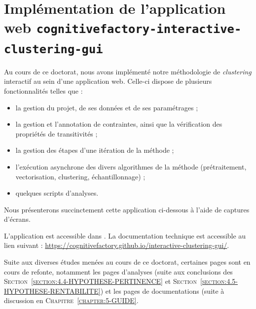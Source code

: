\section{Implémentation de l'application web \texttt{cognitivefactory-interactive-clustering-gui}}
\label{section:C.3-DESCRIPTION-IMPLEMENTATION-INTERACTIVE-CLUSTERING-GUI}

	Au cours de ce doctorat, nous avons implémenté notre méthodologie de \textit{clustering} interactif au sein d'une application web.
	Celle-ci dispose de plusieurs fonctionnalités telles que :
	\begin{itemize}
		\item la gestion du projet, de ses données et de ses paramétrages ;
		\item la gestion et l'annotation de contraintes, ainsi que la vérification des propriétés de transitivités ;
		\item la gestion des étapes d'une itération de la méthode ;
		\item l'exécution asynchrone des divers algorithmes de la méthode (prétraitement, vectorisation, clustering, échantillonnage) ;
		\item quelques scripts d'analyses.
	\end{itemize}
	
	Nous présenterons succinctement cette application ci-dessous à l'aide de captures d'écrans.
	
	\begin{leftBarInformation}
		L'application est accessible dans \cite{schild-etal:2022:cognitivefactory-interactiveclusteringgui}.
		La documentation technique est accessible au lien suivant : \url{https://cognitivefactory.github.io/interactive-clustering-gui/}.
	\end{leftBarInformation}
	
	\begin{leftBarAuthorOpinion}
		Suite aux diverses études menées au cours de ce doctorat, certaines pages sont en cours de refonte, notamment les pages d'analyses (suite aux conclusions des \textsc{Section~\ref{section:4.4-HYPOTHESE-PERTINENCE}} et \textsc{Section~\ref{section:4.5-HYPOTHESE-RENTABILITE}}) et les pages de documentations (suite à discussion en \textsc{Chapitre~\ref{chapter:5-GUIDE}}.
	\end{leftBarAuthorOpinion}
	
